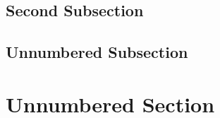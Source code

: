 \documentclass{estcpmm}
\begin{document}
\subsection{Second Subsection}

\lipsum[36]

\subsection*{Unnumbered Subsection}

\lipsum[15]

\section*{Unnumbered Section}

\lipsum[76-90]
\end{document}
